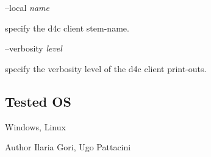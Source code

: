 --local {\itshape name} 
\begin{DoxyItemize}
\item specify the d4c client stem-\/name.
\end{DoxyItemize}

--verbosity {\itshape level} 
\begin{DoxyItemize}
\item specify the verbosity level of the d4c client print-\/outs.
\end{DoxyItemize}\hypertarget{group__d4cServer_tested_os_sec}{}\subsection{Tested O\+S}\label{group__d4cServer_tested_os_sec}
Windows, Linux

\begin{DoxyAuthor}{Author}
Ilaria Gori, Ugo Pattacini 
\end{DoxyAuthor}
